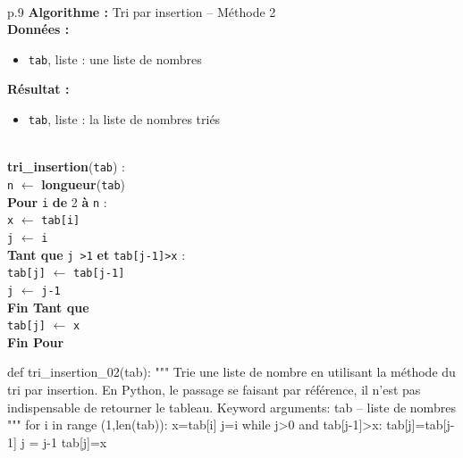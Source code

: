 \documentclass[10pt,fleqn]{article} %
\newcommand{\tsf}[1]{\small{\texttt{#1}}}
\begin{document}
\begin{pseudo}
~\\
\begin{minipage}[c]{.48\linewidth}
\begin{tabular}{p{.9\textwidth}}
\hline
\textbf{Algorithme :} Tri par insertion -- Méthode 2\\
\hline
\textbf{Données :}
\begin{itemize}
\item \tsf{tab}, liste : une liste de nombres
\end{itemize}
\textbf{Résultat :} 
\begin{itemize}
\item \tsf{tab}, liste : la liste de nombres triés
\end{itemize}
\\
\textbf{tri\_insertion}(\tsf{tab}) :\\
\hspace{.4cm} \tsf{n} $\leftarrow$ \textbf{longueur}(\tsf{tab}) \\
\hspace{.4cm}\textbf{Pour} \tsf{i} \textbf{de} 2 \textbf{à} \tsf{n} : \\
\hspace{.8cm} \tsf{x} $\leftarrow$ \tsf{tab[i]} \\
\hspace{.8cm} \tsf{j} $\leftarrow$ \tsf{i} \\
\hspace{.8cm}\textbf{Tant que} \tsf{j >1} \textbf{et} \tsf{tab[j-1]>x}  : \\
\hspace{1.2cm} \tsf{tab[j]} $\leftarrow$ \tsf{tab[j-1]} \\
\hspace{1.2cm} \tsf{j} $\leftarrow$ \tsf{j-1} \\
\hspace{.8cm}\textbf{Fin Tant que} \\
\hspace{.8cm} \tsf{tab[j]} $\leftarrow$ \tsf{x} \\
\hspace{.4cm}\textbf{Fin Pour} \\
\hline
\end{tabular}
\end{minipage} \hfill
\begin{minipage}[c]{.48\linewidth}
\begin{python}
def tri_insertion_02(tab):
    """ 
    Trie une liste de nombre en utilisant la méthode 
    du tri par insertion.
    En Python, le passage se faisant par référence, 
    il n'est pas indispensable de retourner le tableau.
    Keyword arguments:
    tab -- liste de nombres
    """
    for i in range (1,len(tab)):
        x=tab[i]
        j=i
        while j>0 and tab[j-1]>x:
            tab[j]=tab[j-1]
            j = j-1
        tab[j]=x
\end{python}
\end{minipage}
\end{pseudo}
\end{document}
